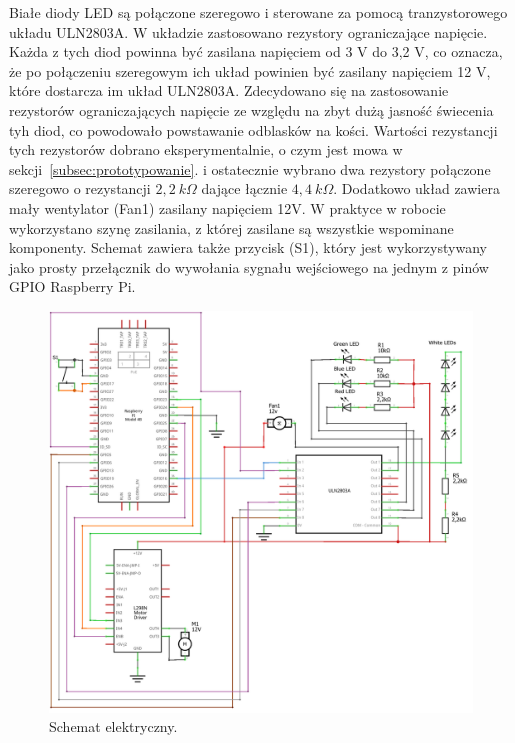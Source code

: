 Białe diody LED są połączone szeregowo i sterowane za pomocą tranzystorowego układu ULN2803A. W układzie zastosowano rezystory ograniczające napięcie. Każda z tych diod powinna być 
zasilana napięciem od 3 V do 3,2 V, co oznacza, że po połączeniu szeregowym ich układ powinien być zasilany napięciem 12 V, które dostarcza im układ ULN2803A. Zdecydowano się na zastosowanie
rezystorów ograniczających napięcie ze względu na zbyt dużą jasność świecenia tyh diod, co powodowało powstawanie odblasków na kości. Wartości rezystancji tych rezystorów dobrano eksperymentalnie, o czym jest mowa w sekcji~\ref{subsec:prototypowanie}.
i ostatecznie wybrano dwa rezystory połączone szeregowo o rezystancji $2{,}2~k\Omega$ dające łącznie $4{,}4~k\Omega$.
Dodatkowo układ zawiera mały wentylator (Fan1) zasilany napięciem 12V. W praktyce w robocie wykorzystano szynę zasilania, z której zasilane są wszystkie wspominane komponenty. 
Schemat zawiera także przycisk (S1), który jest wykorzystywany jako prosty przełącznik do wywołania sygnału wejściowego na jednym z pinów GPIO Raspberry Pi.

\begin{figure}[H]
    \centering
    \includegraphics[width=0.95\linewidth]{chapters/03-praca-wlasna/figures/electronics circut_schem_fan.png}
    \caption{\label{fig:electronics}Schemat elektryczny.}
\end{figure}